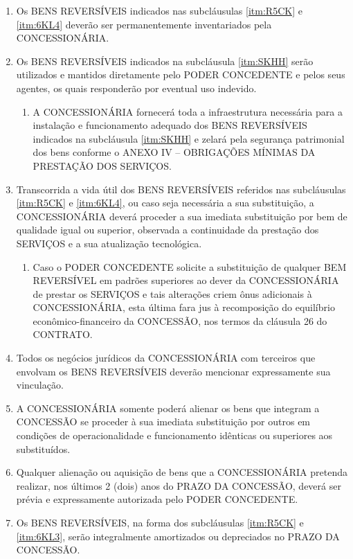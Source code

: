 \documentclass[a4paper,11pt]{report} %
\begin{document}
\begin{enumerate}
\item \label{itm:WB69} Os BENS REVERSÍVEIS indicados nas subcláusulas \ref{itm:R5CK} e \ref{itm:6KL4} deverão ser permanentemente inventariados pela CONCESSIONÁRIA.

\item \label{itm:SJRY} Os BENS REVERSÍVEIS indicados na subcláusula \ref{itm:SKHH} serão utilizados e mantidos diretamente pelo PODER CONCEDENTE e pelos seus agentes, os quais responderão por eventual uso indevido.

\begin{enumerate}[label*=\arabic*.]
\item \label{itm:4JAZ} A CONCESSIONÁRIA fornecerá toda a infraestrutura necessária para a instalação e funcionamento adequado dos BENS REVERSÍVEIS indicados na subcláusula \ref{itm:SKHH} e zelará pela segurança patrimonial dos bens conforme o ANEXO IV – OBRIGAÇÕES MÍNIMAS DA PRESTAÇÃO DOS SERVIÇOS.
\end{enumerate}

\item \label{itm:T8P9} Transcorrida a vida útil dos BENS REVERSÍVEIS referidos nas subcláusulas \ref{itm:R5CK} e \ref{itm:6KL4}, ou caso seja necessária a sua substituição, a CONCESSIONÁRIA deverá proceder a sua imediata substituição por bem de qualidade igual ou superior, observada a continuidade da prestação dos SERVIÇOS e a sua atualização tecnológica.

\begin{enumerate}[label*=\arabic*.]
\item \label{itm:MH6K} Caso o PODER CONCEDENTE solicite a substituição de qualquer BEM REVERSÍVEL em padrões superiores ao dever da CONCESSIONÁRIA de prestar os SERVIÇOS e tais alterações criem ônus adicionais à CONCESSIONÁRIA, esta última fara jus à recomposição do equilíbrio econômico-financeiro da CONCESSÃO, nos termos da cláusula 26 do CONTRATO.
\end{enumerate}

\item \label{itm:P87Z} Todos os negócios jurídicos da CONCESSIONÁRIA com terceiros que envolvam os BENS REVERSÍVEIS deverão mencionar expressamente sua vinculação.

\item \label{item:R5CK} A CONCESSIONÁRIA somente poderá alienar os bens que integram a CONCESSÃO se proceder à sua imediata substituição por outros em condições de operacionalidade e funcionamento idênticas ou superiores aos substituídos. 

\item \label{itm:6KL3} Qualquer alienação ou aquisição de bens que a CONCESSIONÁRIA pretenda realizar, nos últimos 2 (dois) anos do PRAZO DA CONCESSÃO, deverá ser prévia e expressamente autorizada pelo PODER CONCEDENTE. 

\item \label{itm:SKHF} Os BENS REVERSÍVEIS, na forma dos subcláusulas \ref{itm:R5CK} e \ref{itm:6KL3}, serão integralmente amortizados ou depreciados no PRAZO DA CONCESSÃO.

\end{enumerate}
\end{document}
